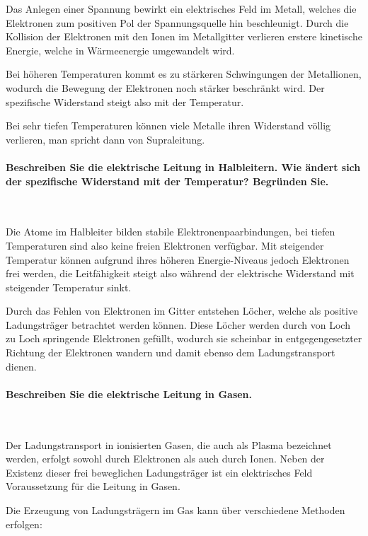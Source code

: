 \documentclass[a4paper, 11pt, ngerman, parskip=half-]{scrartcl}
\begin{document}
Das Anlegen einer Spannung bewirkt ein elektrisches Feld im Metall, welches die Elektronen zum
positiven Pol der Spannungsquelle hin beschleunigt. Durch die Kollision der Elektronen mit den Ionen
im Metallgitter verlieren erstere kinetische Energie, welche in Wärmeenergie umgewandelt wird.

Bei höheren Temperaturen kommt es zu stärkeren Schwingungen der Metallionen, wodurch die Bewegung
der Elektronen noch stärker beschränkt wird. Der spezifische Widerstand steigt also mit der
Temperatur.

Bei sehr tiefen Temperaturen können viele Metalle ihren Widerstand völlig verlieren, man spricht
dann von Supraleitung.

\paragraph{Beschreiben Sie die elektrische Leitung in Halbleitern. Wie ändert sich der spezifische
    Widerstand mit der Temperatur? Begründen Sie.} ~

Die Atome im Halbleiter bilden stabile Elektronenpaarbindungen, bei tiefen Temperaturen sind also
keine freien Elektronen verfügbar. Mit steigender Temperatur können aufgrund ihres höheren
Energie-Niveaus jedoch Elektronen frei werden, die Leitfähigkeit steigt also während der elektrische
Widerstand mit steigender Temperatur sinkt.

Durch das Fehlen von Elektronen im Gitter entstehen Löcher, welche als positive Ladungsträger
betrachtet werden können. Diese Löcher werden durch von Loch zu Loch springende Elektronen gefüllt,
wodurch sie scheinbar in entgegengesetzter Richtung der Elektronen wandern und damit ebenso dem
Ladungstransport dienen.

\paragraph{Beschreiben Sie die elektrische Leitung in Gasen.} ~

Der Ladungstransport in ionisierten Gasen, die auch als Plasma bezeichnet werden, erfolgt sowohl
durch Elektronen als auch durch Ionen. Neben der Existenz dieser frei beweglichen Ladungsträger ist
ein elektrisches Feld Voraussetzung für die Leitung in Gasen.

Die Erzeugung von Ladungsträgern im Gas kann über verschiedene Methoden erfolgen:
\end{document}
